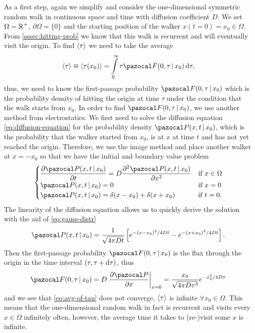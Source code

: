 As a first step, again we simplify and consider the one-dimensional symmetric random walk in continuous space and time with diffusion coefficient $D$. We set $\Omega = \operatorname{\mathbb{R}}^+$, $\partial\Omega=\{0\}$ and the starting position of the walker $x(t=0)=x_0 \in \Omega$. From \autoref{sssec:hitting-prob} we know that this walk is recurrent and will eventually visit the origin. To find $\left<\tau\right>$ we need to take the average
\begin{equation}\label{eq:avg-of-tau}
 \mfpt \equiv \avg{\tau(x_0)} = \int\limits_0^\infty \tau \F(0, \tau \,|\, x_0) \diff \tau,
\end{equation}
thus, we need to know the first-passage probability $\F(0, \tau \,|\, x_0)$ which is the probability density of hitting the origin at time $\tau$ under the condition that the walk starts from $x_0$. In order to find $\F(0, \tau \,|\, x_0)$, we use another method from electrostatics. We first need to solve the diffusion equation \ref{eq:diffusion-equation} for the probability density $\P(x,t \,|\, x_0)$, which is the probability that the walker started from $x_0$, is at $x$ at time $t$ and has not yet reached the origin. Therefore, we use the image method and place another walker at $x=-x_0$ so that we have the initial and boundary value problem
\begin{equation*}
 \begin{cases}
  \dfrac{\partial \P(x, t \,|\, x_0)}{\partial t} = D \dfrac{\partial^2 \P(x, t \,|\, x_0)}{\partial x^2} & \textrm{if } x \in \Omega \\
  \P(x,t \,|\, x_0) = 0 & \textrm{if } x = 0 \\
  \P(x,t \,|\, x_0) = \delta(x-x_0) + \delta(x+x_0) & \textrm{if } t = 0.
 \end{cases}
\end{equation*}
The linearity of the diffusion equation allows us to quickly derive the solution with the aid of \autoref{eq:gauss-distr}
\begin{equation*}
 \P(x,t \,|\, x_0) = \frac{1}{\sqrt{4 \pi D t}}\left[e^{-(x-x_0)^2 / 4 Dt} - e^{-(x+x_0)^2 / 4 Dt}\right].
\end{equation*}
Then the first-passage probability $\F(0, \tau \,|\, x_0)$ is the flux through the origin in the time interval $(\tau, \tau+\mathop{}\!\mathrm{d} \tau)$, thus
\begin{equation*}
 \F(0, \tau \,|\, x_0) = D \left. \dfrac{\partial \P}{\partial x} \right|_{x=0} = \dfrac{x_0}{\sqrt{4 \pi D \tau^3}} e^{-x_0^2 / 4 D \tau}
\end{equation*}
and we see that \autoref{eq:avg-of-tau} does not converge, \ie $\left<\tau\right>$ is infinite $\forall x_0 \in \Omega$. This means that the one-dimensional random walk in fact is recurrent and visits every $x \in \Omega$ infinitely often, however, the average time it takes to (re-)visit some $x$ is infinite.

